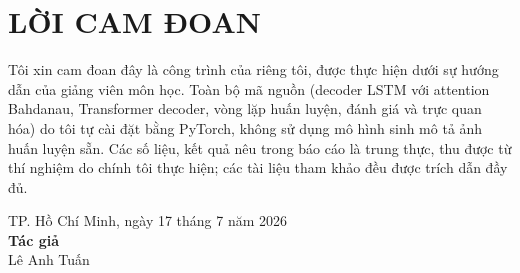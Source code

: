 \chapter*{LỜI CAM ĐOAN}

Tôi xin cam đoan đây là công trình của riêng tôi, được thực hiện dưới sự hướng dẫn
của giảng viên môn học. Toàn bộ mã nguồn (decoder LSTM với attention Bahdanau,
Transformer decoder, vòng lặp huấn luyện, đánh giá và trực quan hóa) do tôi tự
cài đặt bằng PyTorch, không sử dụng mô hình sinh mô tả ảnh huấn luyện sẵn.
Các số liệu, kết quả nêu trong báo cáo là trung thực, thu được từ thí nghiệm
do chính tôi thực hiện; các tài liệu tham khảo đều được trích dẫn đầy đủ.

\vspace{1.5cm}
\begin{flushright}
	TP. Hồ Chí Minh, ngày 17 tháng 7 năm 2026\\[0.3cm]
	\textbf{Tác giả}\\[2cm]
	Lê Anh Tuấn
\end{flushright}
\clearpage
